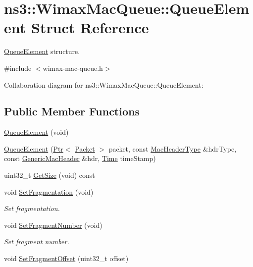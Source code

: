 \hypertarget{structns3_1_1WimaxMacQueue_1_1QueueElement}{}\section{ns3\+:\+:Wimax\+Mac\+Queue\+:\+:Queue\+Element Struct Reference}
\label{structns3_1_1WimaxMacQueue_1_1QueueElement}


\hyperlink{structns3_1_1WimaxMacQueue_1_1QueueElement}{Queue\+Element} structure.  




{\ttfamily \#include $<$wimax-\/mac-\/queue.\+h$>$}



Collaboration diagram for ns3\+:\+:Wimax\+Mac\+Queue\+:\+:Queue\+Element\+:
\subsection*{Public Member Functions}
\begin{DoxyCompactItemize}
\item 
\hyperlink{structns3_1_1WimaxMacQueue_1_1QueueElement_a3c3e5f03f369c2cd6077a2081c676fc7}{Queue\+Element} (void)
\item 
\hyperlink{structns3_1_1WimaxMacQueue_1_1QueueElement_a0f5bcfc0d8b70394ff669ec974759837}{Queue\+Element} (\hyperlink{classns3_1_1Ptr}{Ptr}$<$ \hyperlink{classns3_1_1Packet}{Packet} $>$ packet, const \hyperlink{classns3_1_1MacHeaderType}{Mac\+Header\+Type} \&hdr\+Type, const \hyperlink{classns3_1_1GenericMacHeader}{Generic\+Mac\+Header} \&hdr, \hyperlink{classns3_1_1Time}{Time} time\+Stamp)
\item 
uint32\+\_\+t \hyperlink{structns3_1_1WimaxMacQueue_1_1QueueElement_aee6fd51d35135543aaeb1e2839ff36bd}{Get\+Size} (void) const 
\item 
void \hyperlink{structns3_1_1WimaxMacQueue_1_1QueueElement_abb33c9e28cd81d0b577d7af8e70bcb93}{Set\+Fragmentation} (void)
\begin{DoxyCompactList}\small\item\em Set fragmentation. \end{DoxyCompactList}\item 
void \hyperlink{structns3_1_1WimaxMacQueue_1_1QueueElement_ac462938455631820023819b7cc19bd9b}{Set\+Fragment\+Number} (void)
\begin{DoxyCompactList}\small\item\em Set fragment number. \end{DoxyCompactList}\item 
void \hyperlink{structns3_1_1WimaxMacQueue_1_1QueueElement_aeaf56a66c92e8dd014cd023637c00c68}{Set\+Fragment\+Offset} (uint32\+\_\+t offset)
\end{DoxyCompactItemize}
